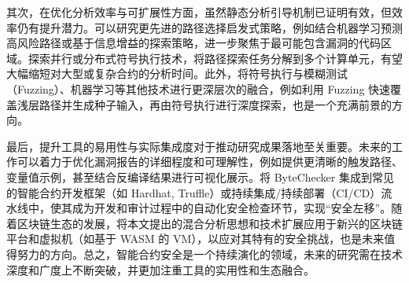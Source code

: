 \documentclass[print, master, vlined, timesmath]{DissertUESTC}
\begin{document}
其次，在优化分析效率与可扩展性方面，虽然静态分析引导机制已证明有效，但效率仍有提升潜力。可以研究更先进的路径选择启发式策略，例如结合机器学习预测高风险路径或基于信息增益的探索策略，进一步聚焦于最可能包含漏洞的代码区域。探索并行或分布式符号执行技术，将路径探索任务分解到多个计算单元，有望大幅缩短对大型或复杂合约的分析时间。此外，将符号执行与模糊测试（Fuzzing）、机器学习等其他技术进行更深层次的融合，例如利用 Fuzzing 快速覆盖浅层路径并生成种子输入，再由符号执行进行深度探索，也是一个充满前景的方向。

最后，提升工具的易用性与实际集成度对于推动研究成果落地至关重要。未来的工作可以着力于优化漏洞报告的详细程度和可理解性，例如提供更清晰的触发路径、变量值示例，甚至结合反编译结果进行可视化展示。将 ByteChecker 集成到常见的智能合约开发框架（如 Hardhat, Truffle）或持续集成/持续部署（CI/CD）流水线中，使其成为开发和审计过程中的自动化安全检查环节，实现“安全左移”。随着区块链生态的发展，将本文提出的混合分析思想和技术扩展应用于新兴的区块链平台和虚拟机（如基于 WASM 的 VM），以应对其特有的安全挑战，也是未来值得努力的方向。总之，智能合约安全是一个持续演化的领域，未来的研究需在技术深度和广度上不断突破，并更加注重工具的实用性和生态融合。



\end{document}
